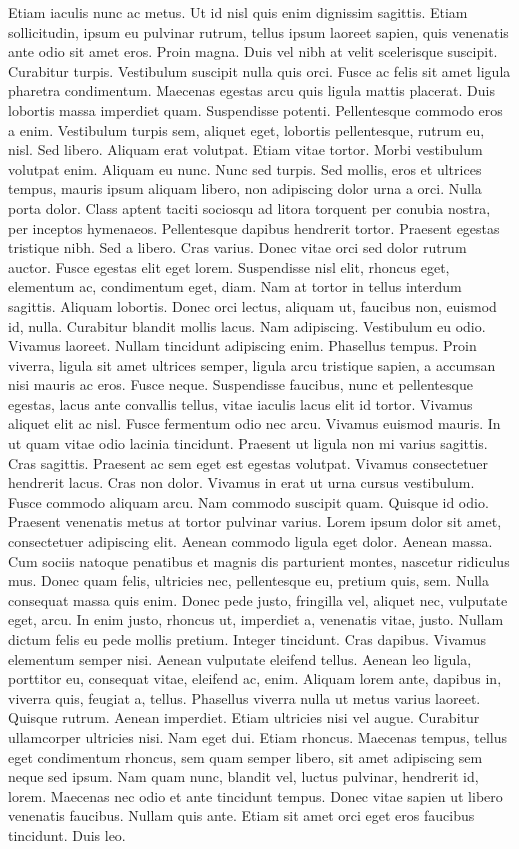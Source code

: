 Etiam iaculis nunc ac metus. Ut id nisl quis enim dignissim sagittis. Etiam sollicitudin, ipsum eu pulvinar rutrum, tellus ipsum laoreet sapien, quis venenatis ante odio sit amet eros. Proin magna. Duis vel nibh at velit scelerisque suscipit. Curabitur turpis. Vestibulum suscipit nulla quis orci. Fusce ac felis sit amet ligula pharetra condimentum. Maecenas egestas arcu quis ligula mattis placerat. Duis lobortis massa imperdiet quam. Suspendisse potenti. Pellentesque commodo eros a enim. Vestibulum turpis sem, aliquet eget, lobortis pellentesque, rutrum eu, nisl. Sed libero. Aliquam erat volutpat. Etiam vitae tortor. Morbi vestibulum volutpat enim. Aliquam eu nunc. Nunc sed turpis. Sed mollis, eros et ultrices tempus, mauris ipsum aliquam libero, non adipiscing dolor urna a orci. Nulla porta dolor. Class aptent taciti sociosqu ad litora torquent per conubia nostra, per inceptos hymenaeos. Pellentesque dapibus hendrerit tortor. Praesent egestas tristique nibh. Sed a libero. Cras varius. Donec vitae orci sed dolor rutrum auctor. Fusce egestas elit eget lorem. Suspendisse nisl elit, rhoncus eget, elementum ac, condimentum eget, diam. Nam at tortor in tellus interdum sagittis. Aliquam lobortis. Donec orci lectus, aliquam ut, faucibus non, euismod id, nulla. Curabitur blandit mollis lacus. Nam adipiscing. Vestibulum eu odio. Vivamus laoreet. Nullam tincidunt adipiscing enim. Phasellus tempus. Proin viverra, ligula sit amet ultrices semper, ligula arcu tristique sapien, a accumsan nisi mauris ac eros. Fusce neque. Suspendisse faucibus, nunc et pellentesque egestas, lacus ante convallis tellus, vitae iaculis lacus elit id tortor. Vivamus aliquet elit ac nisl. Fusce fermentum odio nec arcu. Vivamus euismod mauris. In ut quam vitae odio lacinia tincidunt. Praesent ut ligula non mi varius sagittis. Cras sagittis. Praesent ac sem eget est egestas volutpat. Vivamus consectetuer hendrerit lacus. Cras non dolor. Vivamus in erat ut urna cursus vestibulum. Fusce commodo aliquam arcu. Nam commodo suscipit quam. Quisque id odio. Praesent venenatis metus at tortor pulvinar varius. Lorem ipsum dolor sit amet, consectetuer adipiscing elit. Aenean commodo ligula eget dolor. Aenean massa. Cum sociis natoque penatibus et magnis dis parturient montes, nascetur ridiculus mus. Donec quam felis, ultricies nec, pellentesque eu, pretium quis, sem. Nulla consequat massa quis enim. Donec pede justo, fringilla vel, aliquet nec, vulputate eget, arcu. In enim justo, rhoncus ut, imperdiet a, venenatis vitae, justo. Nullam dictum felis eu pede mollis pretium. Integer tincidunt. Cras dapibus. Vivamus elementum semper nisi. Aenean vulputate eleifend tellus. Aenean leo ligula, porttitor eu, consequat vitae, eleifend ac, enim. Aliquam lorem ante, dapibus in, viverra quis, feugiat a, tellus. Phasellus viverra nulla ut metus varius laoreet. Quisque rutrum. Aenean imperdiet. Etiam ultricies nisi vel augue. Curabitur ullamcorper ultricies nisi. Nam eget dui. Etiam rhoncus. Maecenas tempus, tellus eget condimentum rhoncus, sem quam semper libero, sit amet adipiscing sem neque sed ipsum. Nam quam nunc, blandit vel, luctus pulvinar, hendrerit id, lorem. Maecenas nec odio et ante tincidunt tempus. Donec vitae sapien ut libero venenatis faucibus. Nullam quis ante. Etiam sit amet orci eget eros faucibus tincidunt. Duis leo. 